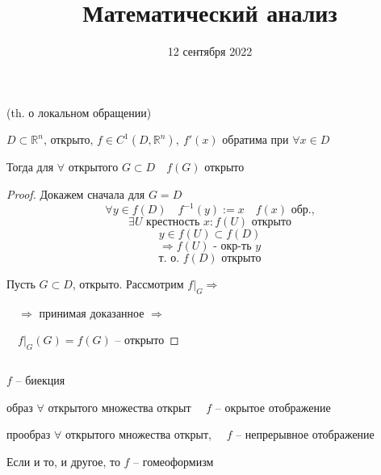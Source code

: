 

\DeclareMathOperator{\Kerr}{Ker}
\DeclareMathOperator{\Imm}{Im}
\DeclareMathOperator{\Int}{Int}
\DeclareMathOperator{\Mat}{Mat}
\DeclareMathOperator{\rank}{rank}
\DeclareMathOperator*{\id}{id}
\renewcommand{\phi}{\varphi}
\renewcommand{\theta}{\vartheta}
\renewcommand{\epsilon}{\varepsilon}
\newcommand{\R}{\mathbb{R}}
\renewcommand{\C}{\mathbb{C}}


    \title{Математический анализ}
    \date{12 сентября 2022}
    \maketitle{}

    \pagebreak

    \begin{corollary}
        (th. о локальном обращении)
        \par $D \subset \R^n$,  открыто, $f \in C^1(D, \R^n), \ f'(x)$ обратима при $\forall x \in D$
        \par Тогда для $\forall$ открытого $G \subset D \quad f(G)$ открыто
    \end{corollary}
    \begin{proof}
        Докажем сначала для $G = D$
        \[ \forall y \in f(D) \quad f^{-1}(y) := x \quad f(x) \text{ обр.,} \]
        \[ \exists U \text{ крестность } x : f(U) \text{ открыто} \]
        \[ y \in f(U) \subset f(D) \]
        \[ \Rightarrow f(U) \text{ - окр-ть } y \]
        \[\text{т. о. } f(D) \text{ открыто}\]
        \par Пусть $G \subset D$, открыто. Рассмотрим $f\big|_G \Rightarrow$
        \par $\quad \Rightarrow$ принимая доказанное $\Rightarrow$
        \par $\quad f\big|_G(G) = f(G)$ -- открыто
    \end{proof}

    $ $
    \linebreak
    \par $f$ -- биекция
    \par образ $\forall$ открытого множества открыт $\quad f$ -- окрытое отображение
    \par прообраз $\forall$ открытого множества открыт, $\quad f$ -- непрерывное отображение

    \begin{definition}
        Если и то, и другое, то $f$ -- гомеоформизм
    \end{definition}

